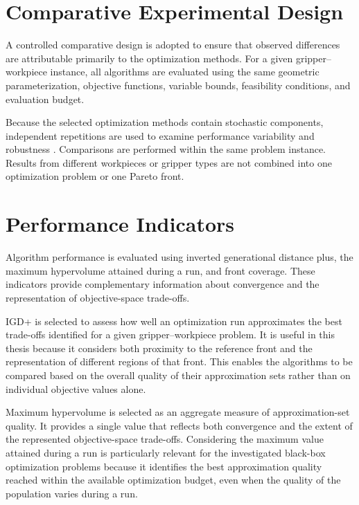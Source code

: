 \section{Comparative Experimental Design}
\label{sec:methodology_comparative_experiments}

A controlled comparative design is adopted to ensure that observed differences are attributable primarily to the optimization methods. For a given
gripper--workpiece instance, all algorithms are evaluated using the same geometric parameterization, objective functions, variable bounds, feasibility
conditions, and evaluation budget.

Because the selected optimization methods contain stochastic components, independent repetitions are used to examine performance variability and
robustness \cite{Bouthillier2021Accounting}. Comparisons are performed within the same problem instance. Results from different workpieces or gripper
types are not combined into one optimization problem or one Pareto front.

\section{Performance Indicators}
\label{sec:methodology_performance_indicators}

Algorithm performance is evaluated using inverted generational distance plus, the maximum hypervolume attained during a run, and front coverage. These
indicators provide complementary information about convergence and the representation of objective-space trade-offs.

IGD+ is selected to assess how well an optimization run approximates the best trade-offs identified for a given gripper--workpiece problem. It is
useful in this thesis because it considers both proximity to the reference front and the representation of different regions of that front. This
enables the algorithms to be compared based on the overall quality of their approximation sets rather than on individual objective values alone.

Maximum hypervolume is selected as an aggregate measure of approximation-set quality. It provides a single value that reflects both convergence and
the extent of the represented objective-space trade-offs. Considering the maximum value attained during a run is particularly relevant for the
investigated black-box optimization problems because it identifies the best approximation quality reached within the available optimization budget,
even when the quality of the population varies during a run.


